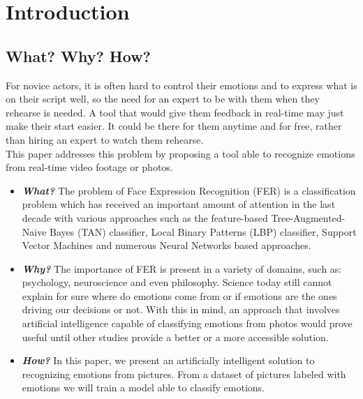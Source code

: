 \documentclass[runningheads,a4paper,11pt]{report}
\begin{document}
\tableofcontents

\newpage


\newpage




\newpage



 


\chapter{Introduction}
\label{chapter:introduction}

\section{What? Why? How?}
\label{section:what}

For novice actors, it is often hard to control their emotions and to express what is on their script well, so the need for an expert to be with them when they rehearse is needed. A tool that would give them feedback in real-time may just make their start easier. It could be there for them anytime and for free, rather than hiring an expert to watch them rehearse.\\
This paper addresses this problem by proposing a tool able to recognize emotions from real-time video footage or photos.

\begin{itemize}
	\item \textbf{\emph{What?}} The problem of Face Expression Recognition (FER) is a classification problem which has received an important amount of attention in the last decade with various approaches such as the feature-based Tree-Augmented-Naive Bayes (TAN) classifier, Local Binary Patterns (LBP) classifier, Support Vector Machines and numerous Neural Networks based approaches. \cite{Caleanu13}
	\item \textbf{\emph{Why?}} The importance of FER is present in a variety of domains, such as: psychology, neuroscience and even philosophy. Science today still cannot explain for sure where do emotions come from or if emotions are the ones driving our decisions or not. With this in mind, an approach that involves artificial intelligence capable of classifying emotions from photos would prove useful until other studies provide a better or a more accessible solution.
	\item \textbf{\emph{How?}} In this paper, we present an artificially intelligent solution to recognizing emotions from pictures. From a dataset of pictures labeled with emotions we will train a model able to classify emotions.
\end{itemize}
\end{document}
